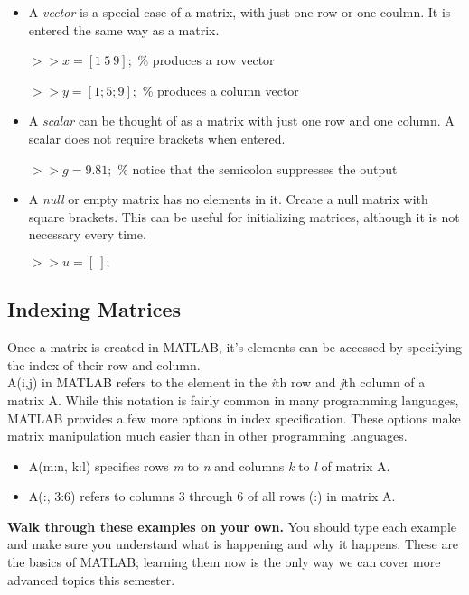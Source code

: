 \documentclass[paper=a4, fontsize=11pt]{scrartcl} %
\numberwithin{equation}{section} %
\numberwithin{figure}{section} %
\numberwithin{table}{section} %
\begin{document}
\begin{itemize}
	\item A \textit{vector} is a special case of a matrix, with just one row or one coulmn.
	It is entered the same way as a matrix.
	
	$>>x = [1\ 5\ 9];$ \hspace{.2\textwidth}\% produces a row vector
	
	$>>y = [1; 5; 9]; $ \hspace{.2\textwidth}\% produces a column vector
	
	\item A \textit{scalar} can be thought of as a matrix with just one row and one column.
	A scalar does not require brackets when entered.
	
	$>>g = 9.81;$ \hspace{.15\textwidth}\% notice that the semicolon suppresses the output
	
	\item A \textit{null} or empty matrix has no elements in it. Create a null matrix with square brackets. This can be useful for initializing matrices, although it is not necessary every time.
	
	$>>u=[\ ];$
\end{itemize}

\subsection{Indexing Matrices}

Once a matrix is created in MATLAB, it's elements can be accessed by specifying the index of their
row and column.\\

A(i,j) in MATLAB refers to the element in the \textit{i}th row and \textit{j}th column of a matrix A. 
While this notation is fairly common in many programming languages, MATLAB provides a few more options in index specification.
These options make matrix manipulation much easier than in other programming languages.

\begin{itemize}
	\item A(m:n, k:l) specifies rows \textit{m} to \textit{n} and columns \textit{k} to \textit{l} of matrix A.
	\item A(:, 3:6) refers to columns 3 through 6 of all rows (:) in matrix A.
\end{itemize}

\textbf{Walk through these examples on your own.} You should type each example and make sure you understand what is happening and why it happens. These are the basics of MATLAB; learning them now is the only way we can cover more advanced topics this semester.\\
\end{document}
